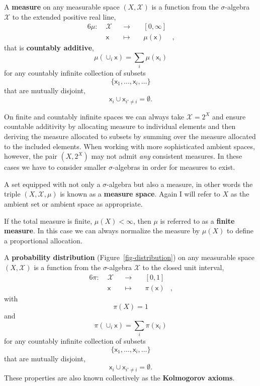 \documentclass[
  letterpaper,
  DIV=11,
  numbers=noendperiod]{scrartcl}
\begin{document}
A \textbf{measure} on any measurable space \((X, \mathcal{X})\) is a
function from the \(\sigma\)-algebra \(\mathcal{X}\) to the extended
positive real line, \begin{alignat*}{6}
\mu :\; & \mathcal{X} & &\rightarrow& \; & [0, \infty] &
\\
& \mathsf{x} & &\mapsto& & \mu(\mathsf{x}) &,
\end{alignat*} that is \textbf{countably additive}, \[
\mu( \cup_{i} \mathsf{x} ) = \sum_{i} \mu( \mathsf{x}_{i} )
\] for any countably infinite collection of subsets \[
\{ \mathsf{x}_{1}, \ldots, \mathsf{x}_{i}, \ldots \}
\] that are mutually disjoint, \[
\mathsf{x}_{i} \cup \mathsf{x}_{i' \ne i} = \emptyset.
\]

On finite and countably infinite spaces we can always take
\(\mathcal{X} = 2^{X}\) and ensure countable additivity by allocating
measure to individual elements and then deriving the measure allocated
to subsets by summing over the measure allocated to the included
elements. When working with more sophisticated ambient spaces, however,
the pair \((X, 2^{X})\) may not admit \emph{any} consistent measures. In
these cases we have to consider smaller \(\sigma\)-algebras in order for
measures to exist.

A set equipped with not only a \(\sigma\)-algebra but also a measure, in
other words the triple \((X, \mathcal{X}, \mu)\) is known as a
\textbf{measure space}. Again I will refer to \(X\) as the ambient set
or ambient space as appropriate.

If the total measure is finite, \(\mu(X) < \infty\), then \(\mu\) is
referred to as a \textbf{finite measure}. In this case we can always
normalize the measure by \(\mu(X)\) to define a proportional allocation.

A \textbf{probability distribution} (Figure~\ref{fig-distribution}) on
any measurable space \((X, \mathcal{X})\) is a function from the
\(\sigma\)-algebra \(\mathcal{X}\) to the closed unit interval,
\begin{alignat*}{6}
\pi :\; & \mathcal{X} & &\rightarrow& \; & [0, 1] &
\\
& \mathsf{x} & &\mapsto& & \pi(\mathsf{x}) &,
\end{alignat*} with \[
\pi(X) = 1
\] and \[
\pi( \cup_{i} \mathsf{x} ) = \sum_{i} \pi( \mathsf{x}_{i} )
\] for any countably infinite collection of subsets \[
\{ \mathsf{x}_{1}, \ldots, \mathsf{x}_{i}, \ldots \}
\] that are mutually disjoint, \[
\mathsf{x}_{i} \cup \mathsf{x}_{i' \ne i} = \emptyset.
\] These properties are also known collectively as the
\textbf{Kolmogorov axioms}.
\end{document}
